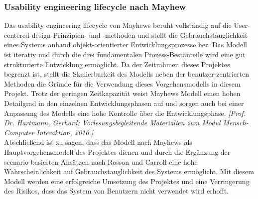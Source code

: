 	\subsubsection{Usability engineering lifecycle nach Mayhew}
	Das usability engineering lifecycle von Mayhews beruht vollständig auf die User-centered-design-Prinzipien- und -methoden und stellt die Gebrauchstauglichkeit eines Systems anhand objekt-orientierter Entwicklungsprozesse her. Das Modell ist iterativ und durch die drei fundamentalen Prozess-Bestanteile wird eine gut strukturierte Entwicklung ermöglicht. Da der Zeitrahmen dieses Projektes begrenzt ist, stellt die Skalierbarkeit des Modells neben der benutzer-zentrierten Methoden die Gründe für die Verwendung dieses Vorgehensmodells in diesem Projekt. Trotz der geringen Zeitkapazität weist Mayhews Modell einen hohen Detailgrad in den einzelnen Entwicklungsphasen auf und sorgen auch bei einer Anpassung des Modells eine hohe Kontrolle über die Entwicklungsphase. \emph{[Prof. Dr. Hartmann, Gerhard: Vorlesungsbegleitende Materialien zum Modul Mensch-Computer Interaktion, 2016.]}\\
	Abschließend ist zu sagen, dass das Modell nach Mayhews als Hauptvorgehensmodell des Projektes dienen und durch die Ergänzung der scenario-basierten-Ansätzen nach Rosson und Carroll eine hohe Wahrscheinlichkeit auf Gebrauchstauglichkeit des Systems ermöglicht. Mit diesem Modell werden eine erfolgreiche Umsetzung des Projektes und eine Verringerung des Risikos, dass das System von Benutzern nicht verwendet wird erhofft.